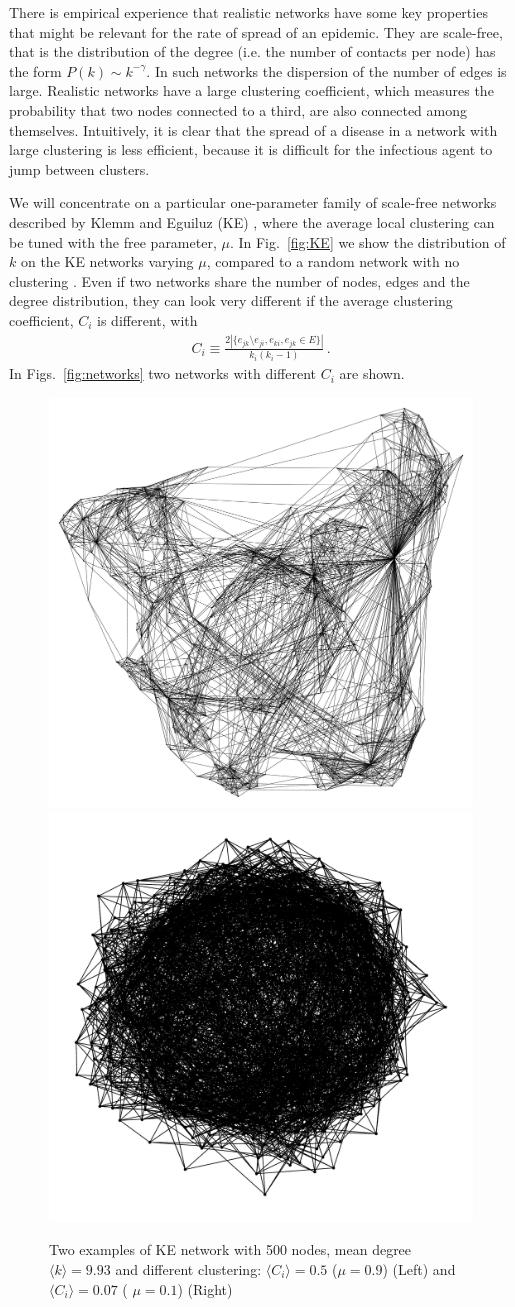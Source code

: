 \documentclass[a4paper,oneside,11pt]{article}
\begin{document}
 There is empirical experience that realistic networks have some key
properties that might be relevant for the rate of spread of an epidemic.
They are scale-free, that is the distribution of the degree (i.e. the number of contacts per node) has the form \(P(k)\sim k^{-\gamma}\). In such networks the dispersion of the number of edges is large. Realistic networks have a large clustering coefficient, which measures the probability that two nodes connected to a third, are also connected among themselves. Intuitively, it is clear that the spread of a disease in a network with large clustering is less efficient, because it is difficult for the infectious agent to jump between clusters.

We will concentrate on a particular
one-parameter family of scale-free networks described by Klemm and Eguiluz (KE)
\cite{Klemm_2002}, where the average local clustering can be tuned with the free parameter, \(\mu\). In Fig.~\ref{fig:KE} we show the distribution of $k$ on the KE networks varying $\mu$, compared to a random network with no clustering . Even if two networks share the number of nodes, edges and the degree distribution, they can look very different if the average clustering coefficient, $C_i$ is different, with
\begin{eqnarray}
C_i \equiv \frac{2|\{e_{jk}\setminus e_{ji},e_{ki},e_{jk}\in E\}|}{k_i(k_i-1)}\,.
\end{eqnarray}
In Figs.~\ref{fig:networks} two networks with different $C_i$ are shown.

\begin{figure}[htbp]
\centering
\includegraphics[width=.45\linewidth]{ke_05_09.pdf} \includegraphics[width=.45\linewidth]{ke_05_01.pdf}
\caption{Two examples of KE network with 500 nodes, mean degree \(\langle k \rangle=9.93\) and different clustering: \(\langle C_i \rangle = 0.5\) (\(\mu=0.9\)) (Left) and \(\langle C_i \rangle = 0.07\) ( \(\mu=0.1\)) (Right)}
\end{figure}
\end{document}
